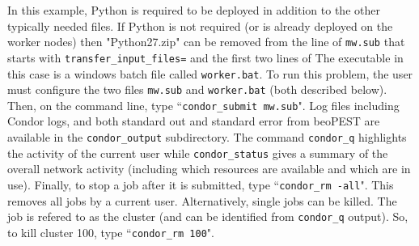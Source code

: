 \documentclass[11pt,twoside,onecolumn]{usgsreport}
\begin{document}
In this example, Python is required to be deployed in addition to the other typically needed files. If Python is not required (or is already deployed on the worker nodes) then "Python27.zip" can be removed from the line of \texttt{mw.sub} that starts with \texttt{transfer\_input\_files=} and the first two lines of The executable in this case is a windows batch file called \texttt{worker.bat}. \newline{}
To run this problem, the user must configure the two files \texttt{mw.sub} and \texttt{worker.bat} (both described below). Then, on the command line, type ``\texttt{condor\_submit mw.sub}". Log files including Condor logs, and both standard out and standard error from beoPEST are available in the \texttt{condor\_output} subdirectory. The command \texttt{condor\_q} highlights the activity of the current user while \texttt{condor\_status} gives a summary of the overall network activity (including which resources are available and which are in use). Finally, to stop a job after it is submitted, type ``\texttt{condor\_rm -all}". This removes all jobs by a current user. Alternatively, single jobs can be killed. The job is refered to as the cluster (and can be identified from \texttt{condor\_q} output). So, to kill cluster 100, type ``\texttt{condor\_rm 100}".
\newpage
\end{document}
